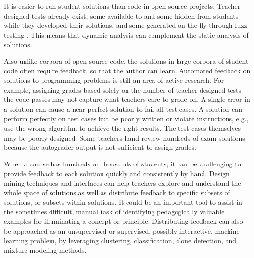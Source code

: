 It is easier to run student solutions than code in open source projects. Teacher-designed tests already exist, some available to and some hidden from students while they developed their solutions, and some generated on the fly through fuzz testing \cite{fuzztesting}. This means that dynamic analysis can complement the static analysis of solutions. %

Also unlike corpora of open source code, the solutions in large corpora of student code often require feedback, so that the author can learn. Automated feedback on solutions to programming problems is still an area of active research. For example, assigning grades based solely on the number of teacher-designed tests the code passes may not capture what teachers care to grade on. A single error in a solution can cause a near-perfect solution to fail all test cases. A solution can perform perfectly on test cases but be poorly written or violate instructions, e.g., use the wrong algorithm to achieve the right results. The test cases themselves may be poorly designed. Some teachers hand-review hundreds of exam solutions because the autograder output is not sufficient to assign grades. %

When a course has hundreds or thousands of students, it can be challenging to provide feedback to each solution quickly and consistently by hand. Design mining techniques and interfaces can help teachers explore and understand the whole space of solutions as well as distribute feedback to specific subsets of solutions, or subsets within solutions. It could be an important tool to assist in the sometimes difficult, manual task of identifying pedagogically valuable examples for illuminating a concept or principle. Distributing feedback can also be approached as an unsupervised or supervised, possibly interactive, machine learning problem, by leveraging clustering, classification, clone detection, and mixture modeling methods. %


